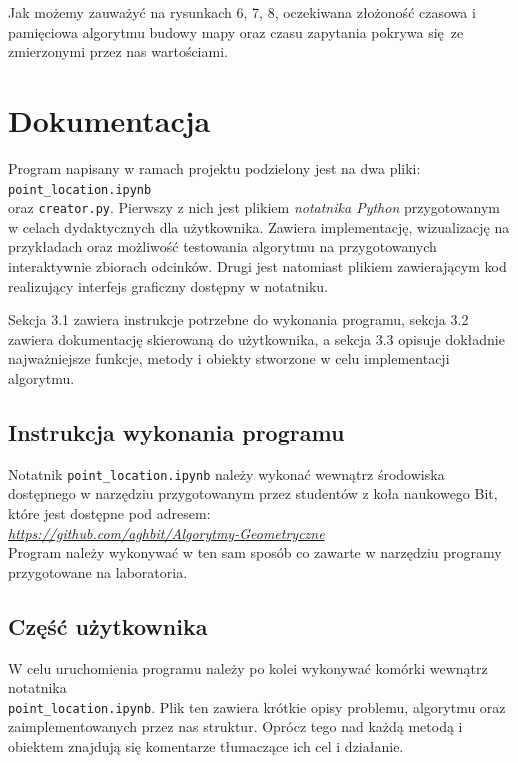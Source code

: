 \documentclass[11pt,a4paper]{article}
\begin{document}
Jak możemy zauważyć na rysunkach 6, 7, 8, oczekiwana złożoność
czasowa i pamięciowa algorytmu budowy mapy oraz czasu zapytania
pokrywa się ze zmierzonymi przez nas wartościami.

\section{Dokumentacja}

Program napisany w ramach projektu podzielony jest
na dwa pliki: \verb|point_location.ipynb| \\
oraz \verb|creator.py|. Pierwszy z nich jest plikiem
\textit{notatnika Python} przygotowanym w celach dydaktycznych
dla użytkownika. Zawiera implementację, wizualizację na przykładach 
oraz możliwość testowania algorytmu na przygotowanych interaktywnie
zbiorach odcinków. Drugi jest natomiast plikiem
zawierającym kod realizujący interfejs graficzny dostępny w notatniku.

Sekcja 3.1 zawiera instrukcje potrzebne do wykonania programu,
sekcja 3.2 zawiera dokumentację skierowaną do użytkownika, %
a sekcja 3.3 opisuje dokładnie najważniejsze funkcje, metody
i obiekty stworzone w celu implementacji algorytmu.

\subsection{Instrukcja wykonania programu}
Notatnik \verb|point_location.ipynb| należy wykonać
wewnątrz środowiska dostępnego w narzędziu 
przygotowanym przez studentów z koła naukowego Bit, 
które jest dostępne pod adresem:
\\
\emph{\hyperlink{https://github.com/aghbit/Algorytmy-Geometryczne}
{https://github.com/aghbit/Algorytmy-Geometryczne}}
\\
Program należy wykonywać w ten sam sposób co
zawarte w narzędziu programy przygotowane na laboratoria.

\subsection{Część użytkownika}
W celu uruchomienia programu należy po kolei
wykonywać komórki wewnątrz notatnika \\
\verb|point_location.ipynb|. Plik ten zawiera
krótkie opisy problemu, algorytmu oraz zaimplementowanych
przez nas struktur. Oprócz tego nad każdą metodą i obiektem
znajdują się komentarze tłumaczące ich cel i działanie.
\end{document}
